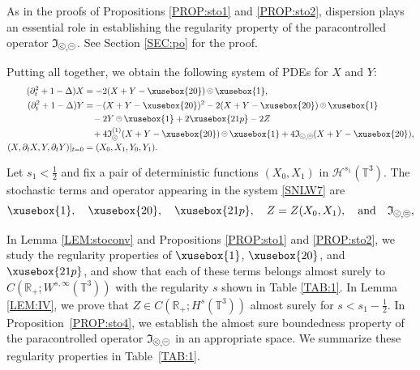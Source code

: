 \documentclass[%
11pt,  reqno]{amsart}
\def\<#1>{\xusebox{#1}}
\newcommand{\pe}{\mathbin{\scaleobj{0.7}{\tikz \draw (0,0) node[shape=circle,draw,inner sep=0pt,minimum size=8.5pt] {\scriptsize  $=$};}}}
\newcommand{\pl}{\mathbin{\scaleobj{0.7}{\tikz \draw (0,0) node[shape=circle,draw,inner sep=0pt,minimum size=8.5pt] {\scriptsize $<$};}}}
\newcommand{\pg}{\mathbin{\scaleobj{0.7}{\tikz \draw (0,0) node[shape=circle,draw,inner sep=0pt,minimum size=8.5pt] {\scriptsize $>$};}}}
\newcommand{\1}{\hspace{0.2mm}\text{I}\hspace{0.2mm}}
\newcommand{\noi}{\noindent}
\newcommand{\R}{\mathbb{R}}
\newcommand{\T}{\mathbb{T}}
\newcommand{\Dl}{\Delta}
\newcommand{\dt}{\partial_t}
\renewcommand{\H}{\mathcal{H}}
\newcommand{\If}{\mathfrak{I}}
\numberwithin{equation}{section}
\numberwithin{theorem}{section}
\begin{document}
As in the proofs of Propositions \ref{PROP:sto1} and \ref{PROP:sto2}, 
dispersion plays an essential role in 
establishing the regularity property
of  the paracontrolled operator $\If_{\pl, \pe}$.
See Section \ref{SEC:po} for the proof.

Putting all together, we obtain the following system 
of PDEs for $X$ and $Y$:
\begin{align}
\begin{split}
 (\dt^2  + 1- \Dl) X  &  = - 2 (X+Y-\<20>)\pl \<1>, \\
 (\dt^2 +  1- \Dl) Y  
&   = - (X+Y-\<20>)^2 -  2(X+Y-\<20>)\pg \<1>\\
& \hphantom{X} 
  - 2 Y\pe \<1> + 2 \<21p>
 -2Z \\ 
& \hphantom{X} 
+  4 \If_{\pl}^{(1)}(X + Y - \<20>)\pe \<1> +4 \If_{\pl, \pe}(X + Y - \<20>), \\
(X,  \dt X, Y,     \dt Y)|_{t = 0} & = (X_0, X_1, Y_0, Y_1).
\end{split} 
 \label{SNLW7}
\end{align}





\noi
Let $s_1 < \frac 12$
and fix a pair of deterministic functions  $(X_0, X_1)$ in  $\H^{s_1}(\T^3)$.
The stochastic terms and operator appearing in the system \eqref{SNLW7} are 
\begin{align}
\<1>,\quad \<20>,\quad  \<21p>,
\quad  
Z = Z(X_0, X_1), 
\quad 
\text{and} 
\quad \If_{\pl, \pe}, 
\label{so5}
\end{align}

\noi
In  Lemma  \ref{LEM:stoconv} and Propositions \ref{PROP:sto1} and   \ref{PROP:sto2}, 
we  study the regularity properties of $\<1>$, $\<20>$, and  $\<21p>$, 
and show that 
each of these terms  belongs almost surely to 
$C(\R_+; W^{s, \infty}(\T^3))$
with the regularity $s$ shown in Table \ref{TAB:1}.
In  Lemma \ref{LEM:IV}, 
we prove that $Z \in C(\R_+; H^{s}(\T^3))$
almost surely for $s < s_1 - \frac{1}{2}$.
In Proposition~\ref{PROP:sto4}, 
we establish the almost sure boundedness property
of the paracontrolled operator
 $\If_{\pl, \pe}$
in an appropriate space.
We summarize these regularity properties
 in Table~\ref{TAB:1}.
\end{document}
